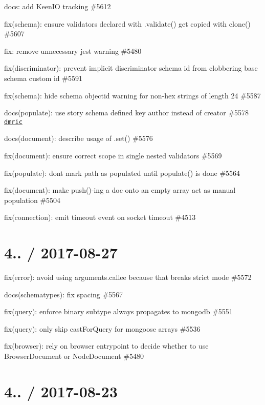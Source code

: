 \begin{DoxyItemize}
\item docs\+: add Keen\+IO tracking \#5612
\item fix(schema)\+: ensure validators declared with {\ttfamily .validate()} get copied with clone() \#5607
\item fix\+: remove unnecessary jest warning \#5480
\item fix(discriminator)\+: prevent implicit discriminator schema id from clobbering base schema custom id \#5591
\item fix(schema)\+: hide schema objectid warning for non-\/hex strings of length 24 \#5587
\item docs(populate)\+: use story schema defined key author instead of creator \#5578 \href{https://github.com/dmric}{\tt dmric}
\item docs(document)\+: describe usage of {\ttfamily .set()} \#5576
\item fix(document)\+: ensure correct scope in single nested validators \#5569
\item fix(populate)\+: don\textquotesingle{}t mark path as populated until populate() is done \#5564
\item fix(document)\+: make push()-\/ing a doc onto an empty array act as manual population \#5504
\item fix(connection)\+: emit timeout event on socket timeout \#4513
\end{DoxyItemize}

\section*{4.. / 2017-\/08-\/27 }


\begin{DoxyItemize}
\item fix(error)\+: avoid using arguments.\+callee because that breaks strict mode \#5572
\item docs(schematypes)\+: fix spacing \#5567
\item fix(query)\+: enforce binary subtype always propagates to mongodb \#5551
\item fix(query)\+: only skip cast\+For\+Query for mongoose arrays \#5536
\item fix(browser)\+: rely on browser entrypoint to decide whether to use Browser\+Document or Node\+Document \#5480
\end{DoxyItemize}

\section*{4.. / 2017-\/08-\/23 }


